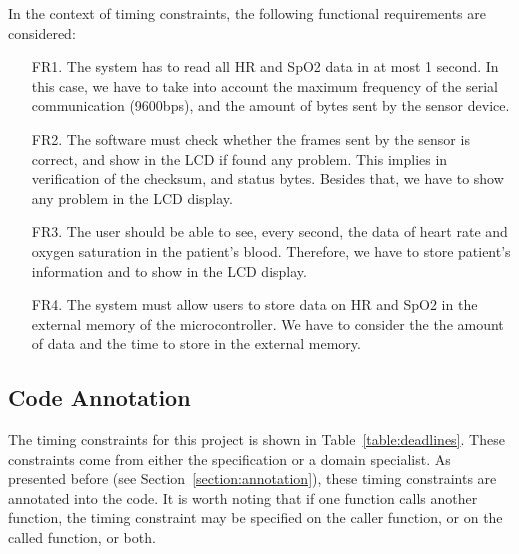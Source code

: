 \documentclass{llncs}
\begin{document}
In the context of timing constraints, the following functional requirements are considered:
\begin{enumerate}
 \item [FR1.]The system has to read all HR and SpO2 data in at most 1 second.
       In this case, we have to take into account the maximum frequency of the serial communication (9600bps),
       and the amount of bytes sent by the sensor device.
 \item [FR2.]The software must check whether the frames sent by the sensor is correct, and show in the LCD if found any problem.
       This implies in verification of the checksum, and status bytes.
       Besides that, we have to show any problem in the LCD display.
 \item [FR3.]The user should be able to see, every second, the data of heart rate and oxygen saturation in the patient's blood.
       Therefore, we have to store patient's information and to show in the LCD display.
 \item [FR4.]The system must allow users to store data on HR and SpO2 in the external memory of the microcontroller.
       We have to consider the the amount of data and the time to store in the external memory.
\end{enumerate}




\subsection{Code Annotation}


The timing constraints for this project is shown in Table~\ref{table:deadlines}. 
These constraints come from either the specification or a domain specialist.
As presented before (see Section~\ref{section:annotation}), these timing constraints are annotated into the code. 
It is worth noting that if one function calls another function, the timing constraint may be specified 
on the caller function, or on the called function, or both. 
\end{document}

